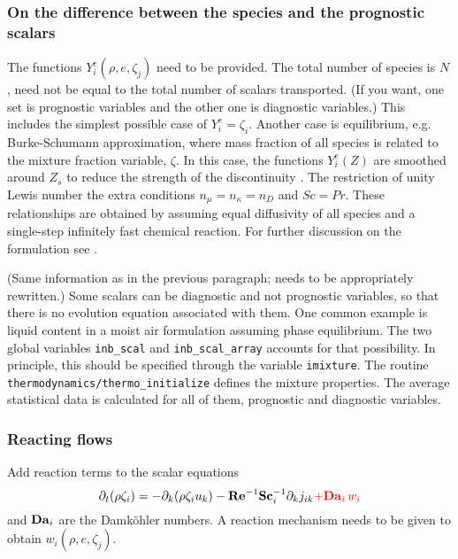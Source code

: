 \subsubsection{On the difference between the species and the prognostic scalars}

The functions $Y_i^e(\rho,e,\zeta_j)$ need to be provided. The total number of species is $N$, need not be equal to the total number of scalars transported. (If you want, one set is prognostic variables and the other one is diagnostic variables.) This includes the simplest possible case of $Y_i^e = \zeta_i$. Another case is equilibrium, e.g. Burke-Schumann approximation, where mass fraction of all species is related to the mixture fraction variable, $\zeta$.  In this case, the functions $Y_i^e(Z)$ are smoothed around $Z_s$ to reduce the strength of the discontinuity \citep{Higuera:1994}. The restriction of unity Lewis number the extra conditions $n_\mu=n_\kappa=n_D$ and $Sc=Pr$. These relationships are obtained by assuming equal diffusivity of all species and a single-step infinitely fast chemical reaction.  For further discussion on the formulation see \cite{Williams:1985}.

(Same information as in the previous paragraph; needs to be appropriately rewritten.) Some scalars can be diagnostic and not prognostic variables, so that there is no evolution equation associated with them. One common example is liquid content in a moist air formulation assuming phase equilibrium. The two global variables {\tt inb\_scal} and {\tt inb\_scal\_array} accounts for that possibility. In principle, this should be specified through the variable {\tt imixture}. The routine {\tt thermodynamics/thermo\_initialize} defines the mixture properties. The average statistical data is calculated for all of them, prognostic and diagnostic variables.

\subsubsection{Reacting flows}

Add reaction terms to the scalar equations
\begin{equation}
  \partial_t (\rho \zeta_i)= -\partial_k (\rho \zeta_i u_k)
  - \mathrm{\bf Re}^{-1}\mathrm{\bf Sc}_i^{-1} \partial_k j_{ik} \color{red}{+\mathrm{\bf Da}_i\,w_i}
\end{equation}
and $\mathrm{\bf Da}_i$ are the Damk{\"o}hler numbers. A reaction mechanism needs to be given to obtain $w_i(\rho,e,\zeta_j)$.

